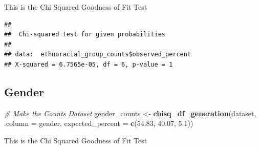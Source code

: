 \documentclass[
  twocolumn]{article}
\newenvironment{Shaded}{\begin{snugshade}}{\end{snugshade}}
\newcommand{\AttributeTok}[1]{\textcolor[rgb]{0.13,0.29,0.53}{#1}}
\newcommand{\CommentTok}[1]{\textcolor[rgb]{0.56,0.35,0.01}{\textit{#1}}}
\newcommand{\FloatTok}[1]{\textcolor[rgb]{0.00,0.00,0.81}{#1}}
\newcommand{\FunctionTok}[1]{\textcolor[rgb]{0.13,0.29,0.53}{\textbf{#1}}}
\newcommand{\NormalTok}[1]{#1}
\newcommand{\OtherTok}[1]{\textcolor[rgb]{0.56,0.35,0.01}{#1}}
\newcommand{\SpecialCharTok}[1]{\textcolor[rgb]{0.81,0.36,0.00}{\textbf{#1}}}
\begin{document}
This is the Chi Squared Goodness of Fit Test

\begin{Shaded}
\end{Shaded}

\begin{verbatim}
## 
##  Chi-squared test for given probabilities
## 
## data:  ethnoracial_group_counts$observed_percent
## X-squared = 6.7565e-05, df = 6, p-value = 1
\end{verbatim}

\subsection{Gender}\label{gender}

\begin{Shaded}
\begin{Highlighting}[]
\CommentTok{\# Make the Counts Dataset}
\NormalTok{gender\_counts }\OtherTok{\textless{}{-}} \FunctionTok{chisq\_df\_generation}\NormalTok{(dataset, }\AttributeTok{.column =}\NormalTok{ gender, }\AttributeTok{expected\_percent =} \FunctionTok{c}\NormalTok{(}\FloatTok{54.83}\NormalTok{, }\FloatTok{40.07}\NormalTok{, }\FloatTok{5.1}\NormalTok{))}
\end{Highlighting}
\end{Shaded}

This is the Chi Squared Goodness of Fit Test

\begin{Shaded}
\end{Shaded}
\end{document}
